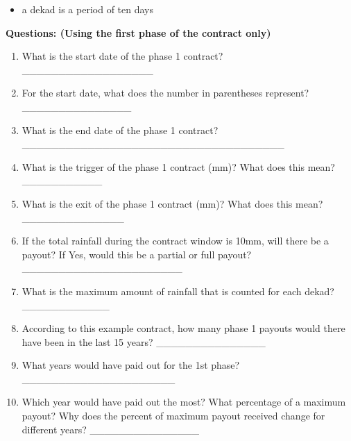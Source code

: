 \documentclass[letterpaper,10pt,english]{sphinxmanual}
\begin{document}
\begin{itemize}
\item {} 
a dekad is a period of ten days

\end{itemize}

\textbf{Questions: (Using the first phase of the contract only)}
\begin{enumerate}
\item {} 
What is the start date of the phase 1 contract? \_\_\_\_\_\_\_\_\_\_\_\_\_\_\_\_\_\_

\item {} 
For the start date, what does the number in parentheses represent? \_\_\_\_\_\_\_\_\_\_\_\_\_\_\_

\item {} 
What is the end date of the phase 1 contract? \_\_\_\_\_\_\_\_\_\_\_\_\_\_\_\_\_\_\_\_\_\_\_\_\_\_\_\_\_\_\_\_\_\_\_\_

\item {} 
What is the trigger of the phase 1 contract (mm)?  What does this mean? \_\_\_\_\_\_\_\_\_\_\_

\item {} 
What is the exit of the phase 1 contract (mm)?  What does this mean? \_\_\_\_\_\_\_\_\_\_\_\_\_\_

\item {} 
If the total rainfall during the contract window is 10mm, will there be a payout? If Yes, would this be a partial or full payout? \_\_\_\_\_\_\_\_\_\_\_\_\_\_\_\_\_\_\_\_\_\_

\item {} 
What is the maximum amount of rainfall that is counted for each dekad? \_\_\_\_\_\_\_\_\_\_\_\_

\item {} 
According to this example contract, how many phase 1 payouts would there have been in the last 15 years? \_\_\_\_\_\_\_\_\_\_\_\_\_\_\_

\item {} 
What years would have paid out for the 1st phase? \_\_\_\_\_\_\_\_\_\_\_\_\_\_\_\_\_\_\_\_\_

\item {} 
Which year would have paid out the most?  What percentage of a maximum payout? Why does the percent of maximum payout received change for different years? \_\_\_\_\_\_\_\_\_\_\_\_\_\_\_

\end{enumerate}
\end{document}
